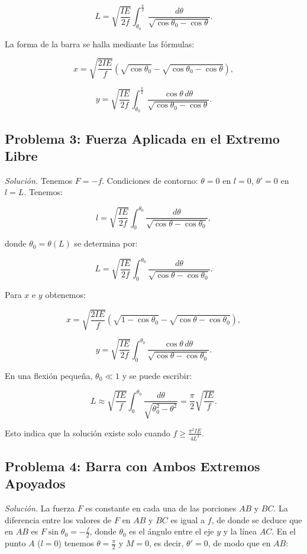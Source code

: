 \documentclass{article}
\begin{document}
$$
L = \sqrt{\frac{IE}{2f}} \int_{\theta_0}^{\frac{\pi}{2}} \frac{d\theta}{\sqrt{\cos \theta_0 - \cos \theta}}.
$$

La forma de la barra se halla mediante las fórmulas:

$$
x = \sqrt{\frac{2IE}{f}} \left( \sqrt{\cos \theta_0} - \sqrt{\cos \theta_0 - \cos \theta} \right),
$$

$$
y = \sqrt{\frac{IE}{2f}} \int_{\theta_0}^{\frac{\pi}{2}} \frac{\cos \theta \, d\theta}{\sqrt{\cos \theta_0 - \cos \theta}}.
$$

\subsection*{Problema 3: Fuerza Aplicada en el Extremo Libre}

\textit{Solución.} Tenemos $F = -f$. Condiciones de contorno: $\theta = 0$ en $l = 0$, $\theta' = 0$ en $l = L$. Tenemos:

$$
l = \sqrt{\frac{IE}{2f}} \int_{0}^{\theta_0} \frac{d\theta}{\sqrt{\cos \theta - \cos \theta_0}},
$$

donde $\theta_0 = \theta(L)$ se determina por:

$$
L = \sqrt{\frac{IE}{2f}} \int_{0}^{\theta_0} \frac{d\theta}{\sqrt{\cos \theta - \cos \theta_0}}.
$$

Para $x$ e $y$ obtenemos:

$$
x = \sqrt{\frac{2IE}{f}} \left( \sqrt{1 - \cos \theta_0} - \sqrt{\cos \theta - \cos \theta_0} \right),
$$

$$
y = \sqrt{\frac{IE}{2f}} \int_{0}^{\theta_0} \frac{\cos \theta \, d\theta}{\sqrt{\cos \theta - \cos \theta_0}}.
$$

En una flexión pequeña, $\theta_0 \ll 1$ y se puede escribir:

$$
L \approx \sqrt{\frac{IE}{f}} \int_{0}^{\theta_0} \frac{d\theta}{\sqrt{\theta_0^2 - \theta^2}} = \frac{\pi}{2} \sqrt{\frac{IE}{f}}.
$$

Esto indica que la solución existe solo cuando $f \geq \frac{\pi^2 IE}{4L^2}$.

\subsection*{Problema 4: Barra con Ambos Extremos Apoyados}

\textit{Solución.} La fuerza $F$ es constante en cada una de las porciones $AB$ y $BC$. La diferencia entre los valores de $F$ en $AB$ y $BC$ es igual a $f$, de donde se deduce que en $AB$ es $F \sin \theta_0 = -\frac{f}{2}$, donde $\theta_0$ es el ángulo entre el eje $y$ y la línea $AC$. En el punto $A$ ($l = 0$) tenemos $\theta = \frac{\pi}{2}$ y $M = 0$, es decir, $\theta' = 0$, de modo que en $AB$:
\end{document}

